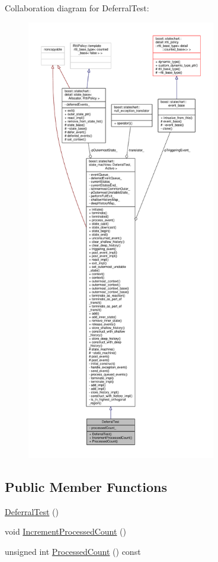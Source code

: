 Collaboration diagram for Deferral\+Test\+:
\nopagebreak
\begin{figure}[H]
\begin{center}
\leavevmode
\includegraphics[height=550pt]{struct_deferral_test__coll__graph}
\end{center}
\end{figure}
\subsection*{Public Member Functions}
\begin{DoxyCompactItemize}
\item 
\mbox{\hyperlink{struct_deferral_test_a6b0e30c5556fe51fe6b03fc87db74309}{Deferral\+Test}} ()
\item 
void \mbox{\hyperlink{struct_deferral_test_af119a5eeb135653bc5d30da46df856b9}{Increment\+Processed\+Count}} ()
\item 
unsigned int \mbox{\hyperlink{struct_deferral_test_ac3989277695cfc48e85b6918ae95672d}{Processed\+Count}} () const
\end{DoxyCompactItemize}
